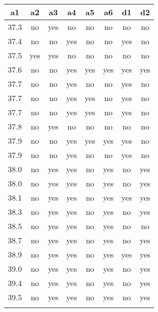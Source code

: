 \begin{table}[H]
    \centering
    \begin{tabular}{cccccc|cc}
        \hline
        \addlinespace[-0.5ex] %
        \hline
        a1 & a2 & a3 & a4 & a5 & a6 & d1 & d2 \\
        \hline
        37.3 & no & yes & no & no & no & no & no \\
        \hline
        37.4 & no & no & yes & no & no & yes & no \\
        \hline
        37.5 & yes & yes & no & no & no & no & no \\
        \hline
        37.6 & no & no & yes & yes & yes & yes & yes \\
        \hline
        37.7 & no & no & yes & no & no & yes & no \\
        \hline
        37.7 & no & no & yes & yes & no & yes & no \\
        \hline
        37.7 & no & no & yes & yes & no & yes & no \\
        \hline
        37.8 & no & yes & no & no & no & no & no \\
        \hline
        37.9 & no & no & yes & yes & yes & yes & no \\
        \hline
        37.9 & no & no & yes & no & no & yes & no \\
        \hline
        38.0 & no & yes & yes & no & yes & no & yes \\
        \hline
        38.0 & no & yes & yes & no & yes & no & yes \\
        \hline
        38.1 & no & yes & yes & no & yes & yes & yes \\
        \hline
        38.3 & no & yes & yes & no & yes & no & yes \\
        \hline
        38.5 & no & yes & yes & no & yes & no & no \\
        \hline
        38.7 & no & yes & yes & no & yes & no & yes \\
        \hline
        38.9 & no & yes & yes & no & yes & yes & yes \\
        \hline
        39.0 & no & yes & yes & no & yes & no & yes \\
        \hline
        39.4 & no & yes & yes & no & yes & no & yes \\
        \hline
        39.5 & no & yes & yes & no & yes & no & yes \\
        \hline
        \addlinespace[-0.5ex] %
        \hline
    \end{tabular}
\end{table}

